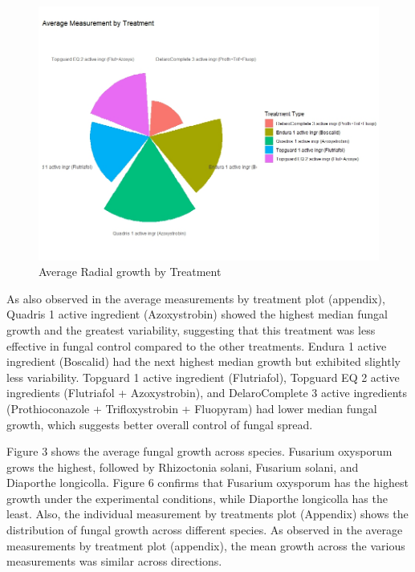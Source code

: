 \documentclass[
  10pt,
  letterpaper,
  twocolumn]{article}
\begin{document}
\begin{figure}

{\centering \includegraphics{Fig3.jpeg}

}

\caption{Average Radial growth by Treatment}

\end{figure}

As also observed in the average measurements by treatment plot
(appendix), Quadris 1 active ingredient (Azoxystrobin) showed the
highest median fungal growth and the greatest variability, suggesting
that this treatment was less effective in fungal control compared to the
other treatments. Endura 1 active ingredient (Boscalid) had the next
highest median growth but exhibited slightly less variability. Topguard
1 active ingredient (Flutriafol), Topguard EQ 2 active ingredients
(Flutriafol + Azoxystrobin), and DelaroComplete 3 active ingredients
(Prothioconazole + Trifloxystrobin + Fluopyram) had lower median fungal
growth, which suggests better overall control of fungal spread.

Figure 3 shows the average fungal growth across species. Fusarium
oxysporum grows the highest, followed by Rhizoctonia solani, Fusarium
solani, and Diaporthe longicolla. Figure 6 confirms that Fusarium
oxysporum has the highest growth under the experimental conditions,
while Diaporthe longicolla has the least. Also, the individual
measurement by treatments plot (Appendix) shows the distribution of
fungal growth across different species. As observed in the average
measurements by treatment plot (appendix), the mean growth across the
various measurements was similar across directions.
\end{document}
